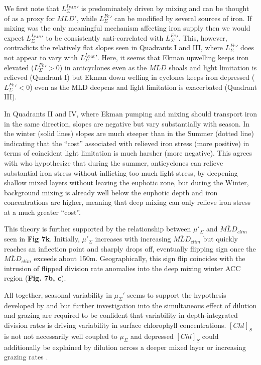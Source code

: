We first note that $L_\Sigma^{I_{PAR}}'$ is predominately driven by mixing and can be thought of as a proxy for $MLD'$, while $L_\Sigma^{Fe}'$ can be modified by several sources of iron. If mixing was the only meaningful mechanism affecting iron supply then we would expect $L_\Sigma^{I_{PAR}}'$ to be consistently anti-correlated with $L_\Sigma^{Fe}'$. This, however, contradicts the relatively flat slopes seen in Quadrants I and III, where $L_\Sigma^{Fe}'$ does not appear to vary with $L_\Sigma^{I_{PAR}}'$. Here, it seems that Ekman upwelling keeps iron elevated ($L_\Sigma^{Fe}'>0$) in anticyclones even as the $MLD$ shoals and light limitation is relieved (Quadrant I) but Ekman down welling in cyclones keeps iron depressed ($L_\Sigma^{Fe}'<0$) even as the MLD deepens and light limitation is exacerbated (Quadrant III).

In Quadrants II and IV, where Ekman pumping and mixing should transport iron in the same direction, slopes are negative but vary substantially with season. In the winter (solid lines) slopes are much steeper than in the Summer (dotted line) indicating that the ``cost'' associated with relieved iron stress (more positive) in terms of coincident light limitation is much harsher (more negative). This agrees with \textcite{SongSeasonalvariationcorrelation2018} who hypothesize that during the summer, anticyclones can relieve substantial iron stress without inflicting too much light stress, by deepening shallow mixed layers without leaving the euphotic zone, but during the Winter, background mixing is already well below the euphotic depth and iron concentrations are higher, meaning that deep mixing can only relieve iron stress at a much greater ``cost''.

This theory is further supported by the relationship between $\mu'_\Sigma$ and $\overline{MLD}_{clim}$ seen in \textbf{Fig 7k}. Initially, $\mu'_\Sigma$  increases with increasing $\overline{MLD}_{clim}$ but quickly reaches an inflection point and sharply drops off, eventually flipping sign once the $\overline{MLD}_{clim}$ exceeds about 150m. Geographically, this sign flip coincides with the intrusion of flipped division rate anomalies into the deep mixing winter ACC region (\textbf{Fig. 7b, c}). 

All together, seasonal variability in $\mu_\Sigma'$ seems to support the hypothesis developed by \textcite{SongSeasonalvariationcorrelation2018} and \textcite{FrengerImprintSouthernOcean2018} but further investigation into the simultaneous effect of dilution and grazing are required to be confident that variability in depth-integrated division rates is driving variability in surface chlorophyll concentrations. $[Chl]_S$ is not not necessarily well coupled to $\mu_\Sigma$ \parencite{RohrVariabilitymechanismscontrolling2017} and depressed $[Chl]_S$ could additionally be explained by dilution across a deeper mixed layer or increasing grazing rates \parencite{BehrenfeldAnnualcyclesecological2013}. 

